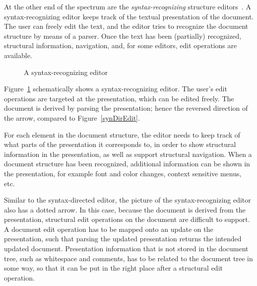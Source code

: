 
At the other end of the spectrum are the {\em syntax-recognizing} structure editors~\cite{budinsky85sre, ballance92pan}. A syntax-recognizing editor keeps track of the textual presentation of the document. The user can freely edit the text, and the editor tries to recognize the document structure by means of a parser. Once the text has been (partially) recognized, structural information, navigation, and, for some editors, edit operations are available.

\begin{figure}
\begin{small}
\begin{center}
\begin{center}
\begin{small}
\noindent
{}
\end{small}
\end{center}\caption{A syntax-recognizing editor}\label{synRecEdit} 
\end{center}
\end{small}
\end{figure}

Figure~\ref{synRecEdit} schematically shows a syntax-recognizing editor. The user's edit operations are targeted at the presentation, which can be edited freely. The document is derived by parsing the presentation; hence the reversed direction of the arrow, compared to Figure~\ref{synDirEdit}.

For each element in the document structure, the editor needs to keep track of what parts of the presentation it corresponds to, in order to show structural information in the presentation, as well as support structural navigation.  When a document structure has been recognized, additional information can be shown in the presentation, for example font and color changes, context sensitive menus, etc.

Similar to the syntax-directed editor, the picture of the syntax-recognizing editor also has a dotted arrow. In this case, because the document is derived from the presentation, structural edit operations on the document are difficult to support. A document edit operation has to be mapped onto an update on the presentation, such that parsing the updated presentation returns the intended updated document. Presentation information that is not stored in the document tree, such as whitespace and comments, has to be related to the document tree in some way, so that it can be put in the right place after a structural edit operation.

